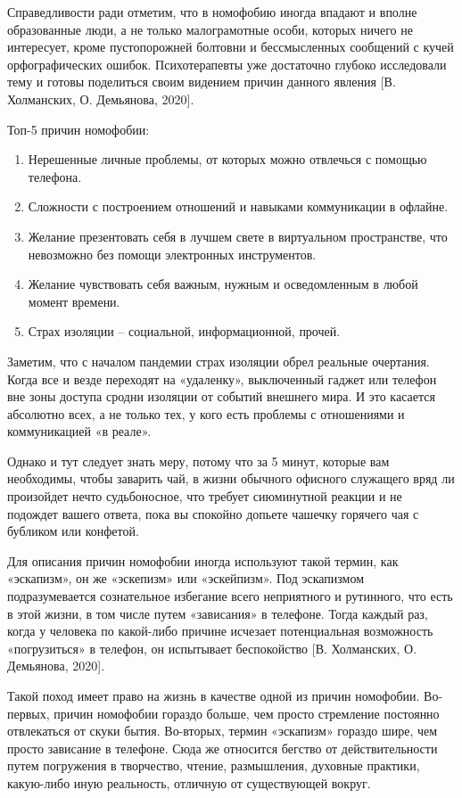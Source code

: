Справедливости ради отметим, что в номофобию иногда впадают и вполне образованные люди, а не только малограмотные особи, которых ничего не интересует, кроме пустопорожней болтовни и бессмысленных сообщений с кучей орфографических ошибок. Психотерапевты уже достаточно глубоко исследовали тему и готовы поделиться своим видением причин данного явления [В. Холманских, О. Демьянова, 2020].

Топ-5 причин номофобии:
\begin{enumerate}
    \item Нерешенные личные проблемы, от которых можно отвлечься с помощью телефона.
    \item Сложности с построением отношений и навыками коммуникации в офлайне.
    \item Желание презентовать себя в лучшем свете в виртуальном пространстве, что невозможно без помощи электронных инструментов.
    \item Желание чувствовать себя важным, нужным и осведомленным в любой момент времени.
    \item Страх изоляции – социальной, информационной, прочей.
\end{enumerate}

Заметим, что с началом пандемии страх изоляции обрел реальные очертания. Когда все и везде переходят на «удаленку», выключенный гаджет или телефон вне зоны доступа сродни изоляции от событий внешнего мира. И это касается абсолютно всех, а не только тех, у кого есть проблемы с отношениями и коммуникацией «в реале».

Однако и тут следует знать меру, потому что за 5 минут, которые вам необходимы, чтобы заварить чай, в жизни обычного офисного служащего вряд ли произойдет нечто судьбоносное, что требует сиюминутной реакции и не подождет вашего ответа, пока вы спокойно допьете чашечку горячего чая с бубликом или конфетой.

Для описания причин номофобии иногда используют такой термин, как «эскапизм», он же «эскепизм» или «эскейпизм». Под эскапизмом подразумевается сознательное избегание всего неприятного и рутинного, что есть в этой жизни, в том числе путем «зависания» в телефоне. Тогда каждый раз, когда у человека по какой-либо причине исчезает потенциальная возможность «погрузиться» в телефон, он испытывает беспокойство [В. Холманских, О. Демьянова, 2020].

Такой поход имеет право на жизнь в качестве одной из причин номофобии. Во-первых, причин номофобии гораздо больше, чем просто стремление постоянно отвлекаться от скуки бытия. Во-вторых, термин «эскапизм» гораздо шире, чем просто зависание в телефоне. Сюда же относится бегство от действительности путем погружения в творчество, чтение, размышления, духовные практики, какую-либо иную реальность, отличную от существующей вокруг.

